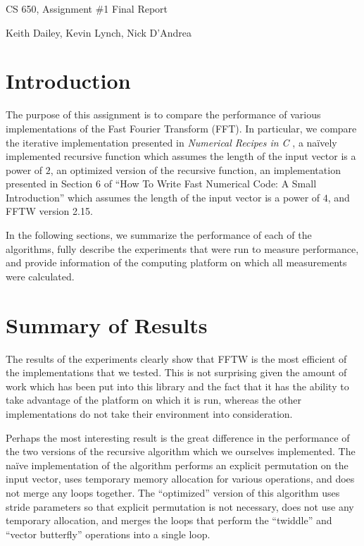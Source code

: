 \documentclass[11 pt]{article}
\author{Keith Dailey}
\title{}
\date{}
\newcommand{\response}{\vspace{.2in}}
\begin{document}
\centerline{\Large{CS 650, Assignment \#1 Final Report}}
\centerline{\large{Keith Dailey, Kevin Lynch, Nick D'Andrea}}

\response

\section{Introduction}

The purpose of this assignment is to compare the performance of various
implementations of the Fast Fourier Transform (FFT).  In particular, we compare
the iterative implementation presented in \emph{Numerical Recipes in C}
\cite{148286}, a na\"{i}vely implemented recursive function which assumes the
length of the input vector is a power of $2$, an optimized version of the
recursive function, an implementation presented in Section 6 of ``How To Write
Fast Numerical Code: A Small Introduction'' \cite{Chellappa:08} which assumes
the length of the input vector is a power of $4$, and FFTW version 2.15.

In the following sections, we summarize the performance of each of the
algorithms, fully describe the experiments that were run to measure
performance, and provide information of the computing platform on which all
measurements were calculated.


\section{Summary of Results}
The results of the experiments clearly show that FFTW is the most efficient of
the implementations that we tested.  This is not surprising given the 
amount of work which has been put into this library and the fact that it has 
the ability to take advantage of the platform on which it is run, whereas the
other implementations do not take their environment into consideration.

Perhaps the most interesting result is the great difference in the performance
of the two versions of the recursive algorithm which we ourselves implemented.
The na\"{i}ve implementation of the algorithm performs an explicit permutation
on the input vector, uses temporary memory allocation for various operations,
and does not merge any loops together.  The ``optimized'' version of this 
algorithm uses stride parameters so that explicit permutation is not necessary,
does not use any temporary allocation, and merges the loops that perform the
``twiddle'' and ``vector butterfly'' operations into a single loop.
\end{document}
